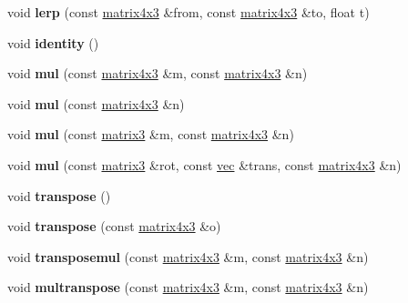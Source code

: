 \begin{DoxyCompactItemize}
\mbox{\label{structmatrix4x3_a3a14e90868c448812bbcc26ec96c2677}} 
void {\bfseries lerp} (const \hyperlink{structmatrix4x3}{matrix4x3} \&from, const \hyperlink{structmatrix4x3}{matrix4x3} \&to, float t)
\item 
\mbox{\label{structmatrix4x3_aeecc3880a5ef3c598060523fe4f1632c}} 
void {\bfseries identity} ()
\item 
\mbox{\label{structmatrix4x3_a1a2a72c7bf948812df19d9964d78c7bb}} 
void {\bfseries mul} (const \hyperlink{structmatrix4x3}{matrix4x3} \&m, const \hyperlink{structmatrix4x3}{matrix4x3} \&n)
\item 
\mbox{\label{structmatrix4x3_a3826cea5e25fb78e7dedb14e310a7440}} 
void {\bfseries mul} (const \hyperlink{structmatrix4x3}{matrix4x3} \&n)
\item 
\mbox{\label{structmatrix4x3_a869d5087a5e132e34f5cb92882d49dea}} 
void {\bfseries mul} (const \hyperlink{structmatrix3}{matrix3} \&m, const \hyperlink{structmatrix4x3}{matrix4x3} \&n)
\item 
\mbox{\label{structmatrix4x3_ac649624acd43aa32bf289e59d8e631a7}} 
void {\bfseries mul} (const \hyperlink{structmatrix3}{matrix3} \&rot, const \hyperlink{structvec}{vec} \&trans, const \hyperlink{structmatrix4x3}{matrix4x3} \&n)
\item 
\mbox{\label{structmatrix4x3_a44fa31be055202c05973412443249d72}} 
void {\bfseries transpose} ()
\item 
\mbox{\label{structmatrix4x3_a8288f1d98340955e21871bbcfb9668ce}} 
void {\bfseries transpose} (const \hyperlink{structmatrix4x3}{matrix4x3} \&o)
\item 
\mbox{\label{structmatrix4x3_a0473be3f5f1062a15e1b7e5d1a948f76}} 
void {\bfseries transposemul} (const \hyperlink{structmatrix4x3}{matrix4x3} \&m, const \hyperlink{structmatrix4x3}{matrix4x3} \&n)
\item 
\mbox{\label{structmatrix4x3_ae3fd0a491733527e3a1c4bac688972a9}} 
void {\bfseries multranspose} (const \hyperlink{structmatrix4x3}{matrix4x3} \&m, const \hyperlink{structmatrix4x3}{matrix4x3} \&n)

\end{DoxyCompactItemize}
